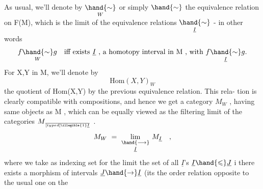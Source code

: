 As usual, we'll denote by $\underset{W}{\hand{\sim}}$ or simply $\hand{\sim}$ the equivalence relation
on F(M), which is the limit  of the equivalence relations $\underset{\underline{I}}{\hand{\sim}}$ - in
other words
\[ f\underset{W}{\hand{\sim}}g \quad \text{iff exists } \underline{I}\text{ , a homotopy interval in M , with } f\underset{\underline{I}}{\hand{\sim}}g. \]
For X,Y in M, we'll denote by 
\[ \mathrm{Hom}(X,Y)_W \]
the quotient of Hom(X,Y) by the previous equivalence relation. This rela-%
tion is clearly compatible with compositions, and hence we get a category
$M_W$ , having same objects as M , which can be equally viewed as the 
filtering limit of the categories $M_{\over[typed]{\illegible{1}}{\underline{I}}}$ .
\[ M_W \ = \ \underset{\underline{I}}{\underset{\hand{\longrightarrow}}{\mathrm{lim}}} \ M_{\underline{I}} \quad , \]
where we   take as indexing set for the limit the  set of all $\underline{I}$'s\hand{,}
  $\underline{I}\hand{\leqslant}\underline{J}$ i there exists a morphism of
intervals $\underline{J}\hand{\to}\underline{I}$ (its the order relation opposite to the usual one on the

